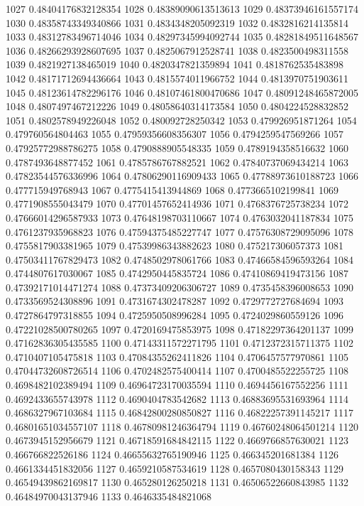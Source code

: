 1027 0.48404176832128354
1028 0.48389090613513613
1029 0.48373946161557174
1030 0.48358743349340866
1031 0.4834348205092319
1032 0.4832816214135814
1033 0.48312783496714046
1034 0.48297345994092744
1035 0.48281849511648567
1036 0.48266293928607695
1037 0.4825067912528741
1038 0.4823500498311558
1039 0.4821927138465019
1040 0.4820347821359894
1041 0.4818762535483898
1042 0.48171712694436664
1043 0.4815574011966752
1044 0.4813970751903611
1045 0.48123614782296176
1046 0.48107461800470686
1047 0.48091248465872005
1048 0.4807497467212226
1049 0.48058640314173584
1050 0.4804224528832852
1051 0.4802578949226048
1052 0.480092728250342
1053 0.479926951871264
1054 0.479760564804463
1055 0.47959356608356307
1056 0.4794259547569266
1057 0.47925772988786275
1058 0.4790888905548335
1059 0.4789194358516632
1060 0.4787493648877452
1061 0.4785786767882521
1062 0.47840737069434214
1063 0.47823544576336996
1064 0.47806290116909433
1065 0.47788973610188723
1066 0.477715949768943
1067 0.4775415413944869
1068 0.4773665102199841
1069 0.4771908555043479
1070 0.47701457652414936
1071 0.4768376725738234
1072 0.47666014296587933
1073 0.47648198703110667
1074 0.4763032041187834
1075 0.4761237935968823
1076 0.47594375485227747
1077 0.47576308729095096
1078 0.4755817903381965
1079 0.47539986343882623
1080 0.475217306057373
1081 0.47503411767829473
1082 0.4748502978061766
1083 0.47466584596593264
1084 0.4744807617030067
1085 0.4742950445835724
1086 0.47410869419473156
1087 0.47392171014471274
1088 0.47373409206306727
1089 0.4735458396008653
1090 0.4733569524308896
1091 0.4731674302478287
1092 0.4729772727684694
1093 0.4727864797318855
1094 0.4725950508996284
1095 0.4724029860559126
1096 0.47221028500780265
1097 0.4720169475853975
1098 0.47182297364201137
1099 0.47162836305435585
1100 0.47143311572271795
1101 0.4712372315711375
1102 0.4710407105475818
1103 0.47084355262411826
1104 0.4706457577970861
1105 0.47044732608726514
1106 0.4702482575400414
1107 0.4700485522255725
1108 0.4698482102389494
1109 0.46964723170035594
1110 0.4694456167552256
1111 0.4692433655743978
1112 0.4690404783542682
1113 0.46883695531693964
1114 0.4686327967103684
1115 0.46842800280850827
1116 0.46822257391145217
1117 0.46801651034557107
1118 0.46780981246364794
1119 0.46760248064501214
1120 0.4673945152956679
1121 0.46718591684842115
1122 0.4669766857630021
1123 0.466766822526186
1124 0.46655632765190946
1125 0.466345201681384
1126 0.4661334451832056
1127 0.4659210587534619
1128 0.4657080430158343
1129 0.46549439862169817
1130 0.465280126250218
1131 0.46506522660843985
1132 0.46484970043137946
1133 0.4646335484821068
